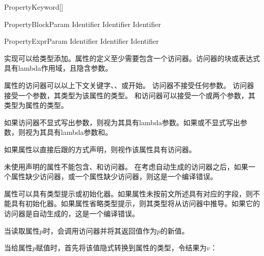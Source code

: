 \begin{bnf}{PropertyKeyword}[\oneof]
\end{bnf}

\begin{bnf}{PropertyBlockParam}
    Identifier \br
    Identifier \terminal{,} Identifier
\end{bnf}

\begin{bnf}{PropertyExprParam}
    Identifier \br
    \terminal{(} Identifier \terminal{,} Identifier \terminal{)}
\end{bnf}

\pnum
实现可以给类型添加。属性的定义至少需要包含一个访问器。访问器的块或表达式具有lambda作用域，且隐含参数。

\pnum
属性的访问器可以以上下文关键字、、或开始。
访问器不接受任何参数。
访问器接受一个参数，其类型为该属性的类型。
和访问器可以接受一个或两个参数，其类型为属性的类型。

\pnum
如果访问器不显式写出参数，则视为其具有lambda参数。如果或不显式写出参数，则视为其具有lambda参数和。

\pnum
如果属性以直接后跟的方式声明，则视作该属性具有访问器。

\pnum
未使用声明的属性不能包含、和访问器。
在考虑自动生成的访问器之后，如果一个属性缺少访问器，或一个属性缺少访问器，则这是一个编译错误。

\pnum
属性可以具有类型提示或初始化器。如果属性未按前文所述具有对应的字段，则不能具有初始化器。如果属性省略类型提示，则其类型将从访问器中推导。如果它的访问器是自动生成的，这是一个编译错误。

\pnum
当读取属性$p$时，会调用访问器并将其返回值作为$p$的新值。

\pnum
当给属性$p$赋值时，首先将该值隐式转换到属性的类型，令结果为$v$：

